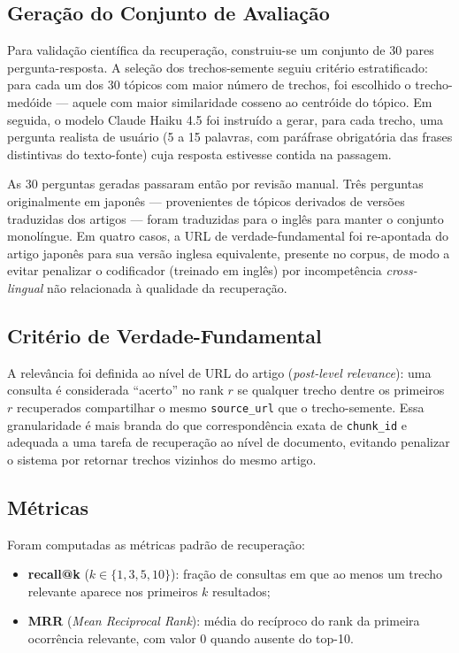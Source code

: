 \documentclass[11pt,a4paper]{article}
\begin{document}
\subsection{Geração do Conjunto de Avaliação}

Para validação científica da recuperação, construiu-se um conjunto de 30 pares pergunta-resposta. A seleção dos trechos-semente seguiu critério estratificado: para cada um dos 30 tópicos com maior número de trechos, foi escolhido o trecho-medóide --- aquele com maior similaridade cosseno ao centróide do tópico. Em seguida, o modelo Claude Haiku 4.5 foi instruído a gerar, para cada trecho, uma pergunta realista de usuário (5 a 15 palavras, com paráfrase obrigatória das frases distintivas do texto-fonte) cuja resposta estivesse contida na passagem.

As 30 perguntas geradas passaram então por revisão manual. Três perguntas originalmente em japonês --- provenientes de tópicos derivados de versões traduzidas dos artigos --- foram traduzidas para o inglês para manter o conjunto monolíngue. Em quatro casos, a URL de verdade-fundamental foi re-apontada do artigo japonês para sua versão inglesa equivalente, presente no corpus, de modo a evitar penalizar o codificador (treinado em inglês) por incompetência \textit{cross-lingual} não relacionada à qualidade da recuperação.

\subsection{Critério de Verdade-Fundamental}

A relevância foi definida ao nível de URL do artigo (\textit{post-level relevance}): uma consulta é considerada ``acerto'' no rank $r$ se qualquer trecho dentre os primeiros $r$ recuperados compartilhar o mesmo \texttt{source\_url} que o trecho-semente. Essa granularidade é mais branda do que correspondência exata de \texttt{chunk\_id} e adequada a uma tarefa de recuperação ao nível de documento, evitando penalizar o sistema por retornar trechos vizinhos do mesmo artigo.

\subsection{Métricas}

Foram computadas as métricas padrão de recuperação:

\begin{itemize}
  \item \textbf{recall@k} ($k \in \{1, 3, 5, 10\}$): fração de consultas em que ao menos um trecho relevante aparece nos primeiros $k$ resultados;
  \item \textbf{MRR} (\textit{Mean Reciprocal Rank}): média do recíproco do rank da primeira ocorrência relevante, com valor 0 quando ausente do top-10.
\end{itemize}
\end{document}
